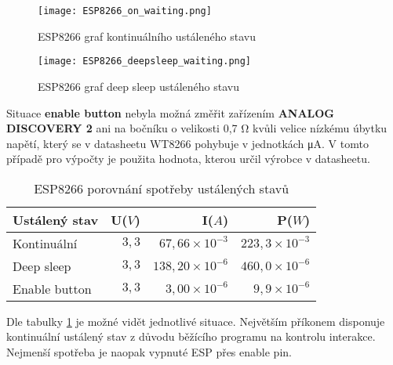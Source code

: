 \documentclass[a4paper, 12pt]{report}
\begin{document}
					\begin{figure}[h]
						\centering
						\texttt{[image: ESP8266\_on\_waiting.png]}
						\caption{ESP8266 graf kontinuálního ustáleného stavu }
						\label{ESP8266_on_waiting}
					\end{figure}
					\begin{figure}[h]
						\centering
						\texttt{[image: ESP8266\_deepsleep\_waiting.png]}
						\caption{ESP8266 graf deep sleep ustáleného stavu}
						\label{ESP8266_deepsleep_waiting}
					\end{figure}

					Situace {\bf enable button} nebyla možná změřit zařízením {\bf ANALOG DISCOVERY 2} ani na bočníku o velikosti 0,7 \si{\ohm} kvůli velice nízkému úbytku napětí, který se v datasheetu WT8266 pohybuje v jednotkách \si{\micro A}. V tomto případě pro výpočty je použita hodnota, kterou určil výrobce v datasheetu.

					\begin{table}[h]
						\centering
						\caption{ESP8266 porovnání spotřeby ustálených stavů}
						\begin{tabular}{||l|r r r||}
							\hline
							Ustálený stav & U($V$) & I($A$) & P($W$)\\
							\hline
							Kontinuální & $3,3$& $67,66 \times 10^{-3}$ & $223,3 \times 10^{-3}$\\
							Deep sleep& $3,3$ & $138,20 \times 10^{-6}$  & $460,0 \times 10^{-6}$\\
							Enable button & $3,3$ & $3,00\times 10^{-6}$ & $9,9\times 10^{-6}$\\
							\hline
						\end{tabular}
						\label{ESP8266 klidové režimy spotřeba}
					\end{table}
					Dle tabulky \ref{ESP8266 klidové režimy spotřeba} je možné vidět jednotlivé situace. Největším příkonem disponuje kontinuální ustálený stav z důvodu běžícího programu na kontrolu interakce. Nejmenší spotřeba je naopak vypnuté ESP přes enable pin. \\
\end{document}
